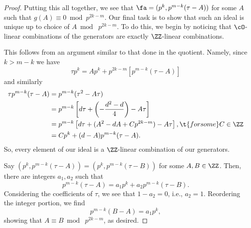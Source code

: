 \documentclass[11pt, proquest]{uwthesis}
\begin{document}
\begin{proof}
  Putting this all together, we see that $\fa = (p^k,p^{m-k}(\tau-A))$ for some $A$ such that $g(A)\equiv 0\bmod p^{2k-m}$. Our final task is to show that such an ideal is unique up to choice of $A\bmod\; p^{2k-m}$.
  To do this, we begin by noticing that $\cO$-linear combinations of the generators are exactly $\ZZ$-linear combinations.
\begin{remark}\label{rmk:linComb}
  This follows from an argument similar to that done in the quotient.
  Namely, since $k>m-k$ we have
  \[
  \tau p^k = Ap^k +p^{2k-m}[p^{m-k}(\tau-A)]
  \]
  and similarly
  \begin{align*}
  \tau p^{m-k}(\tau-A) &= p^{m-k}(\tau^2 - A\tau)\\
                       &= p^{m-k}\left[d\tau +\left(-\frac{d^2-d}{4}\right) - A\tau\right]\\
                       &= p^{m-k}\left[d\tau +(A^2 -dA + Cp^{2k-m}) - A\tau\right], \t{ for some }C\in\ZZ\\
                       &= Cp^k + (d-A)p^{m-k}(\tau-A).\label{eqn:tauLin}
  \end{align*}
  So, every element of our ideal is a $\ZZ$-linear combination of our generators.
\end{remark}


  Say $(p^k,p^{m-k}(\tau-A)) = (p^k,p^{m-k}(\tau-B))$ for some $A,B\in\ZZ$.
  Then, there are integers $a_1,a_2$ such that
  \[
  p^{m-k}(\tau-A) = a_1p^k + a_2p^{m-k}(\tau-B).
  \]
  Considering the coefficients of $\tau$, we see that $1-a_2 = 0$, i.e., $a_2 =1$. Reordering the integer portion, we find
  \[
  p^{m-k}(B-A)=a_1p^k,
  \]
  showing that $A\equiv B\bmod\; p^{2k-m}$, as desired.
    \end{proof}
\end{document}
